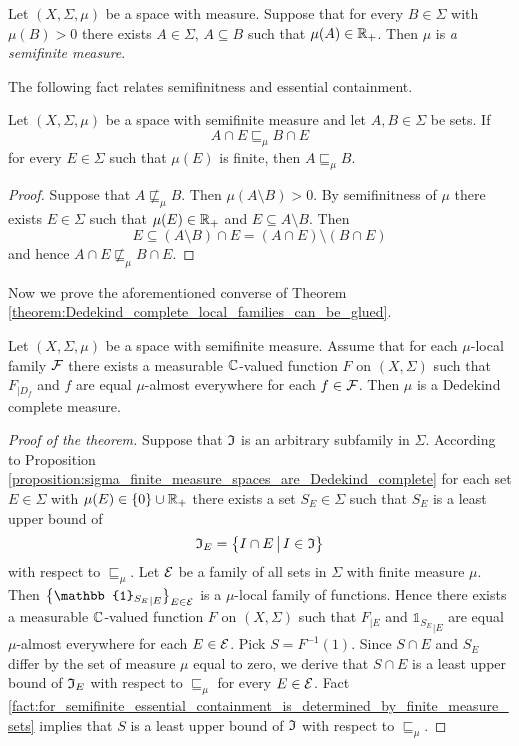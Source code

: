\begin{definition}
  Let $(X,\Sigma,\mu)$ be a space with measure. Suppose that for every $B \in \Sigma$ with $\mu(B) > 0$ there exists $A \in \Sigma$, $A\subseteq B$ such that $\mu(A) \in {\mathbb R}_+$. Then $\mu$ is \textit{a semifinite measure}. 
\end{definition}
\noindent
The following fact relates semifinitness and essential containment.

\begin{fact}\label{fact:for_semifinite_essential_containment_is_determined_by_finite_measure_sets}
  Let $(X,\Sigma,\mu)$ be a space with semifinite measure and let $A,B\in \Sigma$ be sets. If 
  $$A\cap E \sqsubseteq_{\mu} B\cap E$$
  for every $E \in \Sigma$ such that $\mu(E)$ is finite, then $A \sqsubseteq_{\mu} B$.
\end{fact}
\begin{proof}
  Suppose that $A \not \sqsubseteq_{\mu} B$. Then $\mu(A\setminus B) > 0$. By semifinitness of $\mu$ there exists $E \in \Sigma$ such that $\mu(E) \in {\mathbb R}_+$ and $E \subseteq A\setminus B$. Then 
  $$E \subseteq \left(A\setminus B\right) \cap E = \left(A\cap E\right)\setminus \left(B\cap E\right)$$
  and hence $A\cap E \not \sqsubseteq_{\mu} B\cap E$.
\end{proof}
\noindent
Now we prove the aforementioned converse of Theorem \ref{theorem:Dedekind_complete_local_families_can_be_glued}.

\begin{theorem}
  Let $(X,\Sigma,\mu)$ be a space with semifinite measure. Assume that for each $\mu$-local family ${\mathcal F}$ there exists a measurable ${\mathbb C}$-valued function $F$ on $(X,\Sigma)$ such that $F_{\mid D_f}$ and $f$ are equal $\mu$-almost everywhere for each $f \in {\mathcal F}$. Then $\mu$ is a Dedekind complete measure.
\end{theorem}
\noindent
\begin{proof}[Proof of the theorem]
  Suppose that ${\mathfrak I}$ is an arbitrary subfamily in $\Sigma$. According to Proposition \ref{proposition:sigma_finite_measure_spaces_are_Dedekind_complete} for each set $E \in \Sigma$ with $\mu(E) \in \{0\}\cup {\mathbb R}_+$ there exists a set $S_{E} \in \Sigma$ such that $S_{E}$ is a least upper bound of 
  $${\mathfrak I}_E = \big\{I \cap E\,\big|\,I\in {\mathfrak I}\big\}$$
  with respect to $\sqsubseteq_{\mu}$. Let ${\mathcal E}$ be a family of all sets in $\Sigma$ with finite measure $\mu$. Then $\big\{{\mathbb{1}_{S_{E}}}_{\mid E}\big\}_{E \in \cE}$ is a $\mu$-local family of functions. Hence there exists a measurable ${\mathbb C}$-valued function $F$ on $(X,\Sigma)$ such that $F_{\mid E}$ and ${\mathbb{1}_{S_{E}}}_{\mid E}$ are equal $\mu$-almost everywhere for each $E \in {\mathcal E}$. Pick $S = F^{-1}(1)$. Since $S \cap E$ and $S_{E}$ differ by the set of measure $\mu$ equal to zero, we derive that $S \cap E$ is a least upper bound of ${\mathfrak I}_E$ with respect to $\sqsubseteq_{\mu}$ for every $E \in {\mathcal E}$. Fact \ref{fact:for_semifinite_essential_containment_is_determined_by_finite_measure_sets} implies that $S$ is a least upper bound of ${\mathfrak I}$ with respect to $\sqsubseteq_{\mu}$.
\end{proof}

